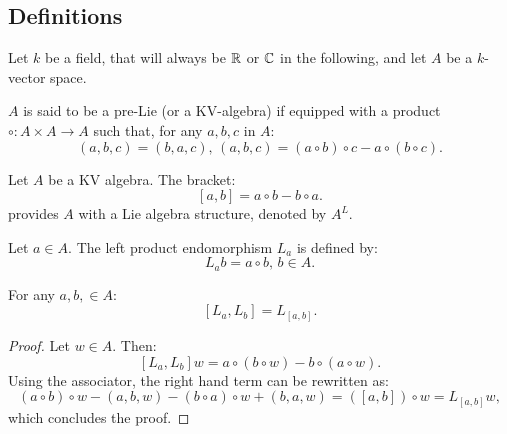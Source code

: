 \subsection{Definitions}
Let $k$ be a field, that will always be $\mathbb{R}$ or $\mathbb{C}$ in the following, and let $A$ be a $k$-vector space. 
\begin{defn}
\label{def:kv_def}
$A$ is said to be a pre-Lie (or a KV-algebra) if equipped with a product $\circ \colon A \times A \to A$ such that, for any $a,b,c$ in $A$:
\begin{equation}
    \label{eq:kv_def}
    (a,b,c)=(b,a,c), \, (a,b,c)=(a\circ b )\circ c - a \circ (b \circ c).
\end{equation}
\end{defn} 
\begin{prop}
\label{prop:subjacent_lie}
Let $A$ be a KV algebra. The bracket:
\begin{equation}
    \label{eq:bracket}
    \left[a,b\right] = a \circ b - b \circ a.
\end{equation}
provides $A$ with a Lie algebra structure, denoted by $A^{L}.$
\end{prop}
\begin{defn}
\label{def:lproduct}
Let $a \in A.$ The left product endomorphism $L_a$ is defined by:
\begin{equation}
    \label{eq:la}
    L_a b = a \circ b, \, b \in A.
\end{equation}
\end{defn}
\begin{prop}
\label{prop:lie_morphism}
For any $a,b, \in A:$
\begin{equation}
    \label{eq:lie_morphism}
    \left[ L_a, L_b \right] = L_{[a,b]}.
\end{equation}
\end{prop}
\begin{proof}
    Let $w \in A$. Then:
    \begin{equation}
    \left[ L_a, L_b \right]w = a \circ \left( b \circ w \right) - b \circ \left(a \circ w \right).
    \end{equation}
    Using the associator, the right hand term can be rewritten as:
    \begin{equation}
        \left( a \circ b \right) \circ w - \left( a,b,w \right) - \left( b \circ a \right) \circ w + \left( b,a,w \right) = \left( [a,b] \right)\circ w = L_{[a,b]} w,
    \end{equation}
   which concludes the proof. 
\end{proof}
